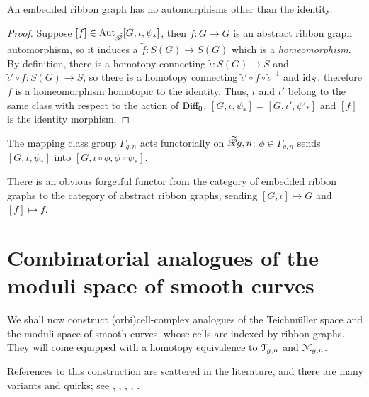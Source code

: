 \begin{lemma}
  \label{lemma:erg-no-aut}
  An embedded ribbon graph has no automorphisms other than the identity.
\end{lemma}
\begin{proof}
  Suppose $[f] \in \operatorname{Aut}_{\mathscr{\widetilde R}_{}}[G, \iota, \psi_*]$, then $f:G\to G$ is an abstract
  ribbon graph automorphism, so it induces a ${\tilde f}: S(G) \to S(G)$
  which is a \emph{homeomorphism}.  By definition, there is a homotopy
  connecting ${\tilde \iota}: S(G) \to S$ and ${\tilde \iota'} \circ {\tilde f}:
  S(G)\to S$, so there is a homotopy connecting ${\tilde \iota'} \circ {\tilde f}
  \circ {\tilde \iota}^{-1}$ and $\operatorname{id}_S$, therefore ${\tilde f}$ is a
  homeomorphism homotopic to the identity.  Thus, $\iota$ and $\iota'$ belong
  to the same class with respect to the action of $\textrm{Diff}_0$, $[G, \iota,
  \psi_*] = [G, \iota', \psi'_*]$ and $[f]$ is the identity morphism.
\end{proof}

The mapping class group $\Gamma_{g,n}$ acts functorially on $\mathscr{\widetilde R}_{}{g,n}$: $\phi
\in \Gamma_{g,n}$ sends $[G, \iota, \psi_*]$ into $[G, \iota \circ \phi, \phi \circ \psi_*]$.

There is an obvious forgetful functor from the category of embedded
ribbon graphs to the category of abstract ribbon graphs, sending $[G,
\iota] \mapsto G$ and $[f] \mapsto f$.



\section{Combinatorial analogues of the moduli space of smooth curves}
\label{sec:mgn-comb}

We shall now construct (orbi)cell-complex analogues of the Teichm\"uller
space and the moduli space of smooth curves, whose cells are indexed
by ribbon graphs.  They will come equipped with a homotopy
equivalence to $\mathcal{T}_{g,n}$ and $\mathcal{M}_{g,n}$.

References to this construction are scattered in the literature, and
there are many variants and quirks; see
\cite{harer;cohomology-of-moduli},
\cite{harer;cohomological-dimension},
\cite{kontsevich;intersection-theory;1992},
\cite{looijenga;cellular-decomposition},
\cite{penner:math.GT/0210326}.


